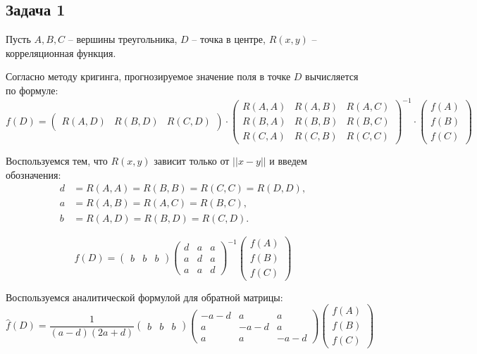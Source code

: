 \documentclass[a4paper, 12pt, onepage]{article}
\begin{document}
\author{Красильников Иван}
\title{}
\maketitle

\subsection*{Задача 1}

Пусть $A, B, C$ -- вершины треугольника, $D$ -- точка в центре,
$R(x, y)$ -- корреляционная функция.

Согласно методу кригинга, прогнозируемое значение поля в точке $D$ вычисляется по формуле:
$$
  f(D) = \begin{pmatrix}
    R(A, D) & R(B, D) & R(C, D)
  \end{pmatrix}
  \cdot
  \begin{pmatrix}
    R(A, A) & R(A, B) & R(A, C) \\
    R(B, A) & R(B, B) & R(B, C) \\
    R(C, A) & R(C, B) & R(C, C) 
  \end{pmatrix}^{-1} \cdot
  \begin{pmatrix}
    f(A) \\ f(B) \\ f(C)
  \end{pmatrix}
$$

Воспользуемся тем, что $R(x, y)$ зависит только от $||x-y||$ и введем
обозначения:
\begin{align*}
d &= R(A, A) = R(B, B) = R(C, C) = R(D, D),\\
a &= R(A, B) = R(A, C) = R(B, C), \\
b &= R(A, D) = R(B, D) = R(C, D).
\end{align*}

$$
  \hat{f}(D) = \begin{pmatrix}
    b & b & b
  \end{pmatrix}
  \begin{pmatrix}
    d & a & a \\
    a & d & a \\
    a & a & d 
  \end{pmatrix}^{-1}
  \begin{pmatrix}
    f(A) \\ f(B) \\ f(C)
  \end{pmatrix}
$$

Воспользуемся аналитической формулой для обратной матрицы:
$$
  \hat{f}(D) =
  \frac{1}{(a-d)(2a+d)}
  \begin{pmatrix}
    b & b & b
  \end{pmatrix}
  \begin{pmatrix}
    -a-d & a & a \\
    a & -a-d & a \\
    a & a & -a-d 
  \end{pmatrix}
  \begin{pmatrix}
    f(A) \\ f(B) \\ f(C)
  \end{pmatrix}
$$
\end{document}
